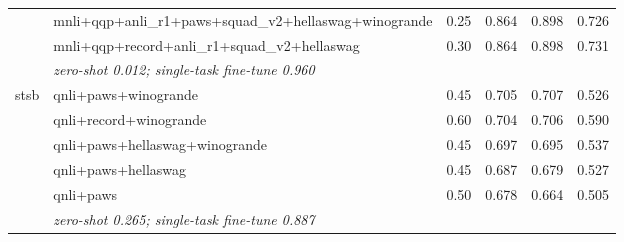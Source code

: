 \begin{table}[t]
\begin{tabular}{llrrrr}
     & mnli+qqp+anli\_r1+paws+squad\_v2+hellaswag+winogrande & 0.25 & 0.864 & 0.898 & 0.726 \\
     & mnli+qqp+record+anli\_r1+squad\_v2+hellaswag & 0.30 & 0.864 & 0.898 & 0.731 \\
    & \multicolumn{5}{l}{\textit{zero-shot 0.012; single-task fine-tune 0.960}} \\
    \addlinespace
    stsb & qnli+paws+winogrande & 0.45 & 0.705 & 0.707 & 0.526 \\
     & qnli+record+winogrande & 0.60 & 0.704 & 0.706 & 0.590 \\
     & qnli+paws+hellaswag+winogrande & 0.45 & 0.697 & 0.695 & 0.537 \\
     & qnli+paws+hellaswag & 0.45 & 0.687 & 0.679 & 0.527 \\
     & qnli+paws & 0.50 & 0.678 & 0.664 & 0.505 \\
    & \multicolumn{5}{l}{\textit{zero-shot 0.265; single-task fine-tune 0.887}} \\
    \bottomrule
  \end{tabular}
\end{table}
